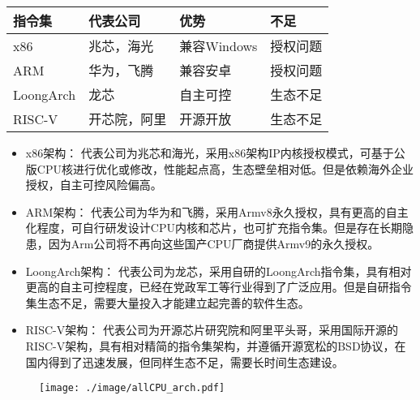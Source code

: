 \begin{table}[!htbp]
\label{tab:CPUs}
\centering
\footnotesize%
\setlength{\tabcolsep}{4pt}%
\renewcommand{\arraystretch}{1.2}%
    \begin{tabular}{llll}
    \hline
    指令集       & 代表公司   & 优势        & 不足         \\ \hline
    x86       & 兆芯，海光  & 兼容Windows & 授权问题 \\
    ARM       & 华为，飞腾  & 兼容安卓      & 授权问题       \\
    LoongArch & 龙芯     & 自主可控      & 生态不足       \\
    RISC-V     & 开芯院，阿里 & 开源开放      & 生态不足    \\ \hline  
    \end{tabular}
\end{table}


    \begin{itemize}
    \item {x86架构： } 代表公司为兆芯和海光，采用x86架构IP内核授权模式，可基于公版CPU核进行优化或修改，性能起点高，生态壁垒相对低。但是依赖海外企业授权，自主可控风险偏高。
    
    \item{ARM架构：} 代表公司为华为和飞腾，采用Armv8永久授权，具有更高的自主化程度，可自行研发设计CPU内核和芯片，也可扩充指令集。但是存在长期隐患，因为Arm公司将不再向这些国产CPU厂商提供Armv9的永久授权。
    
    \item{LoongArch架构：} 代表公司为龙芯，采用自研的LoongArch指令集，具有相对更高的自主可控程度，已经在党政军工等行业得到了广泛应用。但是自研指令集生态不足，需要大量投入才能建立起完善的软件生态。
    
    \item{RISC-V架构：} 代表公司为开源芯片研究院和阿里平头哥，采用国际开源的RISC-V架构，具有相对精简的指令集架构，并遵循开源宽松的BSD协议，在国内得到了迅速发展，但同样生态不足，需要长时间生态建设。
    \end{itemize}


\begin{figure}[!htbp]
    \centering
    \texttt{[image: ./image/allCPU\_arch.pdf]}
    \label{img:allCPU_arch}
  \end{figure}


